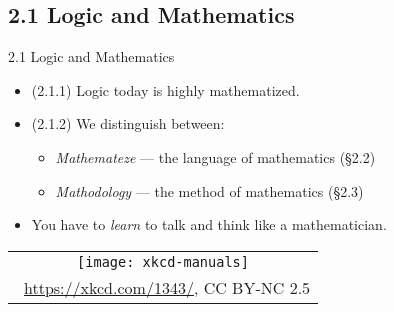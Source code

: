 \subsection{2.1 Logic and Mathematics}
\begin{frame}{2.1 Logic and Mathematics}

	\begin{itemize}

		\item (2.1.1) Logic today is highly mathematized.
		
		\item (2.1.2) We distinguish between:
		
			\begin{itemize}
			
				\item \emph{Mathemateze} --- the language of mathematics (\S2.2)
				
				\item \emph{Mathodology} --- the method of mathematics (\S2.3)
			
			\end{itemize}
			
			\item You have to \emph{learn} to talk and think like a mathematician.
			

	
	\end{itemize}
	
	\begin{center}
		\begin{tabular}{c}
		\texttt{[image: xkcd-manuals]}\\[-1ex]
		{\tiny \textcopyright~\url{https://xkcd.com/1343/}, CC BY-NC 2.5}
		\end{tabular}
		\end{center}
	
\end{frame}

